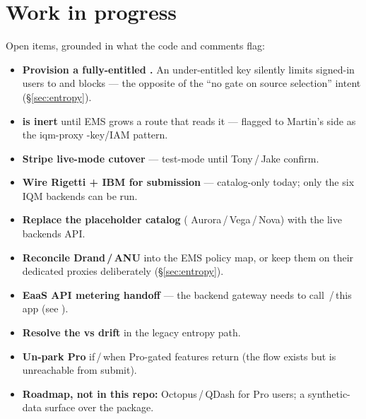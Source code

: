 \documentclass[11pt]{article}
\begin{document}
\section{Work in progress}\label{sec:wip}
Open items, grounded in what the code and comments flag:
\begin{itemize}
\item \textbf{Provision a fully-entitled .} An under-entitled key silently limits signed-in users to
 and blocks  --- the opposite of the ``no gate on source selection'' intent
(\S\ref{sec:entropy}).
\item \textbf{ is inert} until EMS grows a route that reads it --- flagged to Martin's side as the
iqm-proxy -key/IAM pattern.
\item \textbf{Stripe live-mode cutover} --- test-mode until Tony\,/\,Jake confirm.
\item \textbf{Wire Rigetti + IBM for submission} --- catalog-only today; only the six IQM backends can be run.
\item \textbf{Replace the placeholder  catalog} ( Aurora\,/\,Vega\,/\,Nova) with the
live backends API.
\item \textbf{Reconcile Drand\,/\,ANU} into the EMS policy map, or keep them on their dedicated proxies deliberately
(\S\ref{sec:entropy}).
\item \textbf{EaaS API metering handoff} --- the backend gateway needs to call \,/\,this app (see
).
\item \textbf{Resolve the  vs  drift} in the legacy entropy path.
\item \textbf{Un-park Pro} if\,/\,when Pro-gated features return (the flow exists but is unreachable from submit).
\item \textbf{Roadmap, not in this repo:} Octopus\,/\,QDash for Pro users; a synthetic-data surface over the
 package.
\end{itemize}

\end{document}
